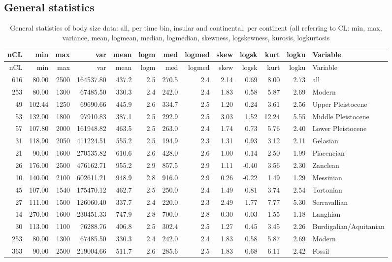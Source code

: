 \documentclass[]{article}
\begin{document}
\newpage

\subsection{General statistics}\label{general-statistics}

\begin{longtable}[]{@{}rrrrrrrrrrrrl@{}}
\caption{General statistics of body size data: all, per time bin,
insular and continental, per continent (all referring to CL: min, max,
variance, mean, logmean, median, logmedian, skewness, logskewness,
kurosis, logkurtosis}\tabularnewline
\toprule
nCL & min & max & var & mean & logm & med & logmed & skew & logsk & kurt
& logku & Variable\tabularnewline
\midrule
\endfirsthead
\toprule
nCL & min & max & var & mean & logm & med & logmed & skew & logsk & kurt
& logku & Variable\tabularnewline
\midrule
\endhead
616 & 80.00 & 2500 & 164537.80 & 437.2 & 2.5 & 270.5 & 2.4 & 2.14 & 0.69
& 8.00 & 2.73 & all\tabularnewline
253 & 80.00 & 1300 & 67485.50 & 330.3 & 2.4 & 242.0 & 2.4 & 1.83 & 0.58
& 5.87 & 2.69 & Modern\tabularnewline
49 & 102.44 & 1250 & 69690.66 & 445.9 & 2.6 & 334.7 & 2.5 & 1.20 & 0.24
& 3.61 & 2.56 & Upper Pleistocene\tabularnewline
53 & 132.00 & 1800 & 97910.83 & 387.1 & 2.5 & 292.9 & 2.5 & 3.03 & 1.52
& 12.24 & 5.55 & Middle Pleistocene\tabularnewline
57 & 107.80 & 2000 & 161948.82 & 463.5 & 2.5 & 263.0 & 2.4 & 1.74 & 0.73
& 5.76 & 2.40 & Lower Pleistocene\tabularnewline
31 & 118.90 & 2050 & 411224.51 & 555.2 & 2.5 & 194.9 & 2.3 & 1.31 & 0.93
& 3.12 & 2.11 & Gelasian\tabularnewline
21 & 90.00 & 1600 & 270535.82 & 610.6 & 2.6 & 428.0 & 2.6 & 1.00 & 0.14
& 2.50 & 1.99 & Piacencian\tabularnewline
26 & 176.00 & 2500 & 476162.71 & 955.2 & 2.9 & 857.5 & 2.9 & 1.11 &
-0.40 & 3.56 & 2.30 & Zanclean\tabularnewline
10 & 140.00 & 2100 & 602611.21 & 948.9 & 2.8 & 916.0 & 2.9 & 0.26 &
-0.22 & 1.49 & 1.29 & Messinian\tabularnewline
45 & 107.00 & 1540 & 175470.12 & 462.7 & 2.5 & 250.0 & 2.4 & 1.49 & 0.81
& 3.74 & 2.54 & Tortonian\tabularnewline
27 & 111.00 & 1500 & 126060.40 & 337.7 & 2.4 & 220.0 & 2.3 & 2.49 & 1.77
& 7.77 & 5.30 & Serravallian\tabularnewline
14 & 270.00 & 1600 & 230451.33 & 747.9 & 2.8 & 700.0 & 2.8 & 0.30 & 0.03
& 1.55 & 1.18 & Langhian\tabularnewline
30 & 113.00 & 1100 & 76288.76 & 406.8 & 2.5 & 302.4 & 2.5 & 1.27 & 0.45
& 3.45 & 2.26 & Burdigalian/Aquitanian\tabularnewline
253 & 80.00 & 1300 & 67485.50 & 330.3 & 2.4 & 242.0 & 2.4 & 1.83 & 0.58
& 5.87 & 2.69 & Modern\tabularnewline
363 & 90.00 & 2500 & 219004.66 & 511.7 & 2.6 & 285.6 & 2.5 & 1.83 & 0.68
& 6.11 & 2.42 & Fossil\tabularnewline

\end{longtable}
\end{document}
